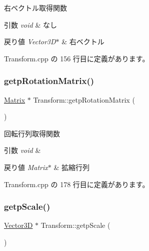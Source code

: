 右ベクトル取得関数 


\begin{DoxyParams}{引数}
{\em void} & なし \\
\hline
\end{DoxyParams}

\begin{DoxyRetVals}{戻り値}
{\em Vector3\+D$\ast$} & 右ベクトル \\
\hline
\end{DoxyRetVals}


 Transform.\+cpp の 156 行目に定義があります。

\mbox{\label{class_transform_af0ea9094ccda77809978208614772447}} 
\subsubsection{\texorpdfstring{getp\+Rotation\+Matrix()}{getpRotationMatrix()}}
{\footnotesize\ttfamily \mbox{\hyperlink{class_matrix}{Matrix}} $\ast$ Transform\+::getp\+Rotation\+Matrix (\begin{DoxyParamCaption}{ }\end{DoxyParamCaption})}



回転行列取得関数 


\begin{DoxyParams}{引数}
{\em void} & \\
\hline
\end{DoxyParams}

\begin{DoxyRetVals}{戻り値}
{\em Matrix$\ast$} & 拡縮行列 \\
\hline
\end{DoxyRetVals}


 Transform.\+cpp の 178 行目に定義があります。

\mbox{\label{class_transform_ac1a821bfab91b10a072eac81efdc741d}} 
\subsubsection{\texorpdfstring{getp\+Scale()}{getpScale()}}
{\footnotesize\ttfamily \mbox{\hyperlink{class_vector3_d}{Vector3D}} $\ast$ Transform\+::getp\+Scale (\begin{DoxyParamCaption}{ }\end{DoxyParamCaption})}



